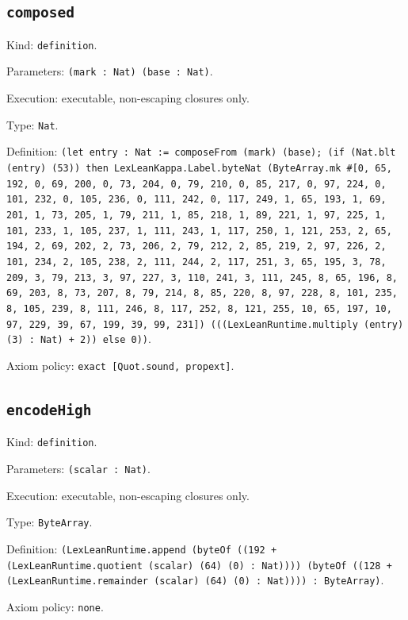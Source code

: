 \documentclass[11pt]{article}
\begin{document}
\subsection*{\texttt{composed}}
\noindent Kind: \texttt{definition}.\par
\noindent Parameters: \texttt{(mark : Nat) (base : Nat)}.\par
\noindent Execution: executable, non-escaping closures only.\par
\noindent Type: \texttt{Nat}.\par
\noindent Definition: \texttt{(let entry : Nat := composeFrom (mark) (base); (if (Nat.blt (entry) (53)) then LexLeanKappa.Label.byteNat (ByteArray.mk \#[0, 65, 192, 0, 69, 200, 0, 73, 204, 0, 79, 210, 0, 85, 217, 0, 97, 224, 0, 101, 232, 0, 105, 236, 0, 111, 242, 0, 117, 249, 1, 65, 193, 1, 69, 201, 1, 73, 205, 1, 79, 211, 1, 85, 218, 1, 89, 221, 1, 97, 225, 1, 101, 233, 1, 105, 237, 1, 111, 243, 1, 117, 250, 1, 121, 253, 2, 65, 194, 2, 69, 202, 2, 73, 206, 2, 79, 212, 2, 85, 219, 2, 97, 226, 2, 101, 234, 2, 105, 238, 2, 111, 244, 2, 117, 251, 3, 65, 195, 3, 78, 209, 3, 79, 213, 3, 97, 227, 3, 110, 241, 3, 111, 245, 8, 65, 196, 8, 69, 203, 8, 73, 207, 8, 79, 214, 8, 85, 220, 8, 97, 228, 8, 101, 235, 8, 105, 239, 8, 111, 246, 8, 117, 252, 8, 121, 255, 10, 65, 197, 10, 97, 229, 39, 67, 199, 39, 99, 231]) (((LexLeanRuntime.multiply (entry) (3) : Nat) + 2)) else 0))}.\par
\noindent Axiom policy: \texttt{exact [Quot.sound, propext]}.\par
\subsection*{\texttt{encodeHigh}}
\noindent Kind: \texttt{definition}.\par
\noindent Parameters: \texttt{(scalar : Nat)}.\par
\noindent Execution: executable, non-escaping closures only.\par
\noindent Type: \texttt{ByteArray}.\par
\noindent Definition: \texttt{(LexLeanRuntime.append (byteOf ((192 + (LexLeanRuntime.quotient (scalar) (64) (0) : Nat)))) (byteOf ((128 + (LexLeanRuntime.remainder (scalar) (64) (0) : Nat)))) : ByteArray)}.\par
\noindent Axiom policy: \texttt{none}.\par
\end{document}
